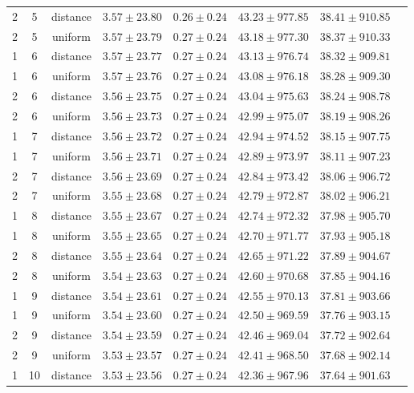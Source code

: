\begin{tabular}{cccrrrrr}
2 & 5 & distance & $3.57 \pm 23.80$ & $0.26 \pm 0.24$ & $43.23 \pm 977.85$ & $38.41 \pm 910.85$\\
2 & 5 & uniform & $3.57 \pm 23.79$ & $0.27 \pm 0.24$ & $43.18 \pm 977.30$ & $38.37 \pm 910.33$\\
1 & 6 & distance & $3.57 \pm 23.77$ & $0.27 \pm 0.24$ & $43.13 \pm 976.74$ & $38.32 \pm 909.81$\\
1 & 6 & uniform & $3.57 \pm 23.76$ & $0.27 \pm 0.24$ & $43.08 \pm 976.18$ & $38.28 \pm 909.30$\\
2 & 6 & distance & $3.56 \pm 23.75$ & $0.27 \pm 0.24$ & $43.04 \pm 975.63$ & $38.24 \pm 908.78$\\
2 & 6 & uniform & $3.56 \pm 23.73$ & $0.27 \pm 0.24$ & $42.99 \pm 975.07$ & $38.19 \pm 908.26$\\
1 & 7 & distance & $3.56 \pm 23.72$ & $0.27 \pm 0.24$ & $42.94 \pm 974.52$ & $38.15 \pm 907.75$\\
1 & 7 & uniform & $3.56 \pm 23.71$ & $0.27 \pm 0.24$ & $42.89 \pm 973.97$ & $38.11 \pm 907.23$\\
2 & 7 & distance & $3.56 \pm 23.69$ & $0.27 \pm 0.24$ & $42.84 \pm 973.42$ & $38.06 \pm 906.72$\\
2 & 7 & uniform & $3.55 \pm 23.68$ & $0.27 \pm 0.24$ & $42.79 \pm 972.87$ & $38.02 \pm 906.21$\\
1 & 8 & distance & $3.55 \pm 23.67$ & $0.27 \pm 0.24$ & $42.74 \pm 972.32$ & $37.98 \pm 905.70$\\
1 & 8 & uniform & $3.55 \pm 23.65$ & $0.27 \pm 0.24$ & $42.70 \pm 971.77$ & $37.93 \pm 905.18$\\
2 & 8 & distance & $3.55 \pm 23.64$ & $0.27 \pm 0.24$ & $42.65 \pm 971.22$ & $37.89 \pm 904.67$\\
2 & 8 & uniform & $3.54 \pm 23.63$ & $0.27 \pm 0.24$ & $42.60 \pm 970.68$ & $37.85 \pm 904.16$\\
1 & 9 & distance & $3.54 \pm 23.61$ & $0.27 \pm 0.24$ & $42.55 \pm 970.13$ & $37.81 \pm 903.66$\\
1 & 9 & uniform & $3.54 \pm 23.60$ & $0.27 \pm 0.24$ & $42.50 \pm 969.59$ & $37.76 \pm 903.15$\\
2 & 9 & distance & $3.54 \pm 23.59$ & $0.27 \pm 0.24$ & $42.46 \pm 969.04$ & $37.72 \pm 902.64$\\
2 & 9 & uniform & $3.53 \pm 23.57$ & $0.27 \pm 0.24$ & $42.41 \pm 968.50$ & $37.68 \pm 902.14$\\
1 & 10 & distance & $3.53 \pm 23.56$ & $0.27 \pm 0.24$ & $42.36 \pm 967.96$ & $37.64 \pm 901.63$\\

\end{tabular}
